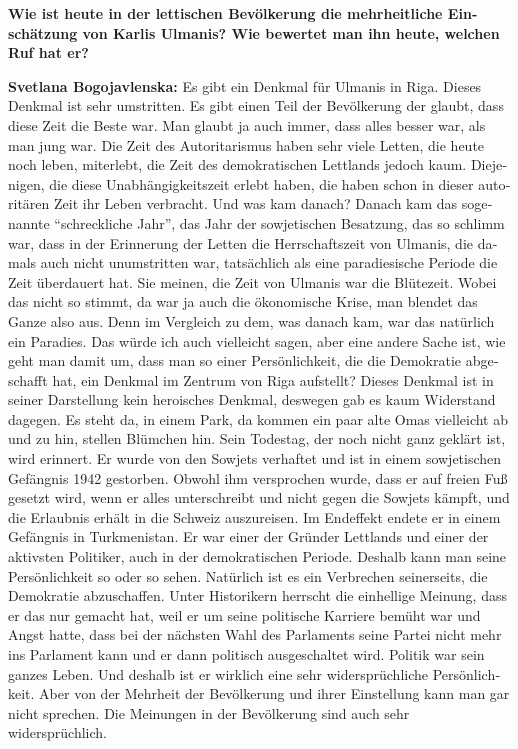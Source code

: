 \begin{otherlanguage}{ngerman}
\textbf{Wie ist heute in der lettischen Bevölkerung die mehrheitliche Einschätzung von Karlis Ulmanis? Wie bewertet man ihn heute, welchen Ruf hat er?}

\textbf{Svetlana Bogojavlenska:} Es gibt ein Denkmal für Ulmanis in Riga. Dieses Denkmal ist sehr umstritten. Es gibt einen Teil der Bevölkerung der glaubt, dass diese Zeit die Beste war. Man glaubt ja auch immer, dass alles besser war, als man jung war. Die Zeit des Autoritarismus haben sehr viele Letten, die heute noch leben, miterlebt, die Zeit des demokratischen Lettlands jedoch kaum. Diejenigen, die diese Unabhängigkeitszeit erlebt haben, die haben schon in dieser autoritären Zeit ihr Leben verbracht. Und was kam danach? Danach kam das sogenannte "`schreckliche Jahr"', das Jahr der sowjetischen Besatzung, das so schlimm war, dass in der Erinnerung der Letten die Herrschaftszeit von Ulmanis, die damals auch nicht unumstritten war, tatsächlich als eine paradiesische Periode die Zeit überdauert hat. Sie meinen, die Zeit von Ulmanis war die Blütezeit. Wobei das nicht so stimmt, da war ja auch die ökonomische Krise, man blendet das Ganze also aus. Denn im Vergleich zu dem, was danach kam, war das natürlich ein Paradies. Das würde ich auch vielleicht sagen, aber eine andere Sache ist, wie geht man damit um, dass man so einer Persönlichkeit, die die Demokratie abgeschafft hat, ein Denkmal im Zentrum von Riga aufstellt? Dieses Denkmal ist in seiner Darstellung kein heroisches Denkmal, deswegen gab es kaum Widerstand dagegen. Es steht da, in einem Park, da kommen ein paar alte Omas vielleicht ab und zu hin, stellen Blümchen hin. Sein Todestag, der noch nicht ganz geklärt ist, wird erinnert. Er wurde von den Sowjets verhaftet und ist in einem sowjetischen Gefängnis 1942 gestorben. Obwohl ihm versprochen wurde, dass er auf freien Fuß gesetzt wird, wenn er alles unterschreibt und nicht gegen die Sowjets kämpft, und die Erlaubnis erhält in die Schweiz auszureisen. Im Endeffekt endete er in einem Gefängnis in Turkmenistan. Er war einer der Gründer Lettlands und einer der aktivsten Politiker, auch in der demokratischen Periode. Deshalb kann man seine Persönlichkeit so oder so sehen. Natürlich ist es ein Verbrechen seinerseits, die Demokratie abzuschaffen. Unter Historikern herrscht die einhellige Meinung, dass er das nur gemacht hat, weil er um seine politische Karriere bemüht war und Angst hatte, dass bei der nächsten Wahl des Parlaments seine Partei nicht mehr ins Parlament kann und er dann politisch ausgeschaltet wird. Politik war sein ganzes Leben. Und deshalb ist er wirklich eine sehr widersprüchliche Persönlichkeit. Aber von der Mehrheit der Bevölkerung und ihrer Einstellung kann man gar nicht sprechen. Die Meinungen in der Bevölkerung sind auch sehr widersprüchlich.


\end{otherlanguage}
